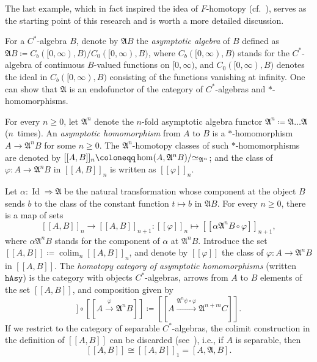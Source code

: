 \documentclass[10pt]{simplearticle}
\newcommand{\colim}{\operatorname*{colim}}
\newcommand{\Id}{\operatorname{Id}}
\newcommand{\hAsy}{\mathtt{hAsy}}
\newcommand{\myllbracket}{[[}
\newcommand{\myrrbracket}{]]}
\newcommand{\bbrackets}[1]{\myllbracket#1\myrrbracket}
\newcommand{\modrel}[1]{/\hspace{-0.6ex}#1\hspace{0.1ex}}
\begin{document}
The last example, which in fact inspired the idea of $F$-homotopy
(cf.~\cite[Definition~2.2]{GHT}), serves as the starting point of
this research and is worth a more detailed discussion.

For a $C^{*}$-algebra $B$, denote by $\mathfrak{A}B$ the \emph{asymptotic
algebra} of $B$ defined as $\mathfrak{A}B\coloneqq C_{b}([0,\infty),B)/C_{0}([0,\infty),B)$,
where $C_{b}([0,\infty),B)$ stands for the $C^{*}$-algebra of continuous
$B$-valued functions on $[0,\infty)$, and $C_{0}([0,\infty),B)$
denotes the ideal in $C_{b}([0,\infty),B)$ consisting of the functions
vanishing at infinity. One can show that $\mathfrak{A}$ is an endofunctor
of the category of $C^{*}$-algebras and $*$-homomorphisms.

For every $n\geq0$, let $\mathfrak{A}^{n}$ denote the $n$-fold
asymptotic algebra functor $\mathfrak{A}^{n}\coloneqq\mathfrak{A}\dots\mathfrak{A}$
($n$~times). An \emph
{asymptotic homomorphism} from $A$ to $B$
is a $*$-homomorphism $A\to\mathfrak{A}^{n}B$ for some $n\geq0$.
The $\mathfrak{A}^{n}$-homotopy classes of such $*$-homomorphisms
are denoted by $\bbrackets{A,B}_{n}\coloneqq\hom(A,\mathfrak{A}^{n}B)\modrel{\simeq_{\mathfrak{A}^{n}}}$;
and the class of $\varphi\colon A\to\mathfrak{A}^{n}B$ in $\bbrackets{A,B}_{n}$
is written as $\bbrackets{\varphi}_{n}$.

Let $\alpha\colon\Id\Rightarrow\mathfrak{A}$ be the natural transformation
whose component at the object $B$ sends $b$ to the class of the
constant function $t\mapsto b$ in $\mathfrak{A}B$. For every $n\geq0$,
there is a map of sets
\[
\bbrackets{A,B}_{n}\to\bbrackets{A,B}_{n+1}\colon\bbrackets{\varphi}_{n}\mapsto\bbrackets{\alpha\mathfrak{A}^{n}B\circ\varphi}_{n+1},
\]
where $\alpha\mathfrak{A}^{n}B$ stands for the component of $\alpha$
at $\mathfrak{A}^{n}B$. Introduce the set
$\bbrackets{A,B}\coloneqq\colim_{n}\bbrackets{A,B}_{n}$,
and denote by $\bbrackets{\varphi}$ the class of $\varphi\colon A\to\mathfrak{A}^{n}B$
in $\bbrackets{A,B}$. The \emph
{homotopy category of asymptotic
homomorphisms} (written $\hAsy$) is the category with objects $C^{*}$-algebras,
arrows from $A$ to $B$ elements of the set $\bbrackets{A,B}$, and
composition given by
\begin{equation}
\bbrackets{B\xrightarrow{\psi}\mathfrak{A}^{m}C}\circ\bbrackets{A\xrightarrow{\varphi}\mathfrak{A}^{n}B}\coloneqq\bbrackets{A\xrightarrow{\mathfrak{A}^{n}\psi\circ\varphi}\mathfrak{A}^{n+m}C}.\label{eq:ashom-cps}
\end{equation}
If we restrict to the category of separable $C^{*}$-algebras, the
colimit construction in the definition of $\bbrackets{A,B}$ can be
discarded (see~\cite[Theorem~2.16]{GHT}), i.e., if $A$ is separable,
then
\[
\bbrackets{A,B}\cong\bbrackets{A,B}_{1}=[A,\mathfrak{A},B].
\]
\end{document}
